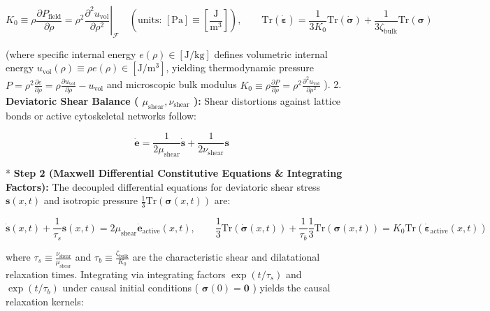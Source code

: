 \documentclass[11pt,a4paper]{article}
\theoremstyle{definition}
\theoremstyle{remark}
\begin{document}
\begin{equation}
\boxed{K_0 \equiv \rho \frac{\partial P_{\text{field}}}{\partial \rho} = \rho^2 \left.\frac{\partial^2 u_{\text{vol}}}{\partial \rho^2}\right|_{\mathcal{F}} \quad \left( \text{units: } [\mathrm{Pa}] \equiv [\frac{\mathrm{J}}{\mathrm{m^3}}] \right), \qquad \mathrm{Tr}(\dot{\boldsymbol{\varepsilon}}) = \frac{1}{3 K_0} \mathrm{Tr}(\dot{\boldsymbol{\sigma}}) + \frac{1}{3 \zeta_{\text{bulk}}} \mathrm{Tr}(\boldsymbol{\sigma})}
\end{equation}


(where specific internal energy $e(\rho) \in [\mathrm{J/kg}]$ defines volumetric internal energy $u_{\text{vol}}(\rho) \equiv \rho e(\rho) \in [\mathrm{J/m^3}]$, yielding thermodynamic pressure $P = \rho^2 \frac{\partial e}{\partial \rho} = \rho \frac{\partial u_{\text{vol}}}{\partial \rho} - u_{\text{vol}}$ and microscopic bulk modulus $K_0 \equiv \rho \frac{\partial P}{\partial \rho} = \rho^2 \frac{\partial^2 u_{\text{vol}}}{\partial \rho^2}$ ).
2. \textbf{Deviatoric Shear Balance ( $\mu_{\text{shear}}, \nu_{\text{shear}}$ ):}
Shear distortions against lattice bonds or active cytoskeletal networks follow:


\begin{equation}
\dot{\mathbf{e}} = \frac{1}{2 \mu_{\text{shear}}} \dot{\mathbf{s}} + \frac{1}{2 \nu_{\text{shear}}} \mathbf{s}
\end{equation}


* \textbf{Step 2 (Maxwell Differential Constitutive Equations \& Integrating Factors):}
The decoupled differential equations for deviatoric shear stress $\mathbf{s}(x, t)$ and isotropic pressure $\frac{1}{3}\mathrm{Tr}(\boldsymbol{\sigma}(x, t))$ are:


\begin{equation}
\boxed{\dot{\mathbf{s}}(x, t) + \frac{1}{\tau_s} \mathbf{s}(x, t) = 2 \mu_{\text{shear}} \dot{\mathbf{e}}_{\text{active}}(x, t), \qquad \frac{1}{3}\mathrm{Tr}(\dot{\boldsymbol{\sigma}}(x, t)) + \frac{1}{\tau_b} \frac{1}{3}\mathrm{Tr}(\boldsymbol{\sigma}(x, t)) = K_0 \mathrm{Tr}(\dot{\boldsymbol{\varepsilon}}_{\text{active}}(x, t))}
\end{equation}


where $\tau_s \equiv \frac{\nu_{\text{shear}}}{\mu_{\text{shear}}}$ and $\tau_b \equiv \frac{\zeta_{\text{bulk}}}{K_0}$ are the characteristic shear and dilatational relaxation times.
Integrating via integrating factors $\exp(t/\tau_s)$ and $\exp(t/\tau_b)$ under causal initial conditions ( $\boldsymbol{\sigma}(0) = \mathbf{0}$ ) yields the causal relaxation kernels:
\end{document}
